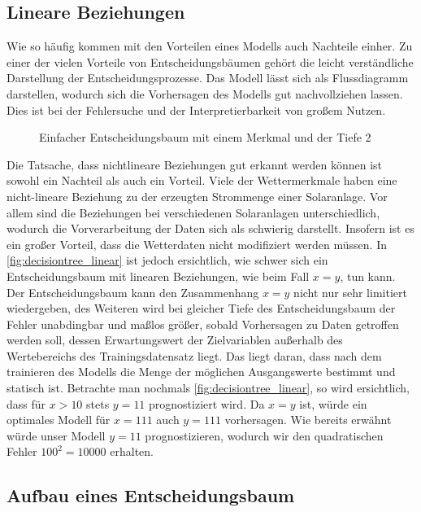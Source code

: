 \documentclass[12pt, a4paper]{article}
\begin{document}

\subsection{Lineare Beziehungen}

Wie so häufig kommen mit den Vorteilen eines Modells auch Nachteile einher. Zu einer der vielen Vorteile von Entscheidungsbäumen gehört die leicht verständliche Darstellung der Entscheidungsprozesse. Das Modell lässt sich als Flussdiagramm darstellen, wodurch sich die Vorhersagen des Modells gut nachvollziehen lassen. Dies ist bei der Fehlersuche und der Interpretierbarkeit von großem Nutzen.

\begin{figure}
\centering
\def\svgwidth{350pt}

\caption{Einfacher Entscheidungsbaum mit einem Merkmal und der Tiefe 2}
\label{fig:decisiontree_linear}
\end {figure}

Die Tatsache, dass nichtlineare Beziehungen gut erkannt werden können ist sowohl ein Nachteil als auch ein Vorteil. Viele der Wettermerkmale haben eine nicht-lineare Beziehung zu der erzeugten Strommenge einer Solaranlage. Vor allem sind die Beziehungen bei verschiedenen Solaranlagen unterschiedlich, wodurch die Vorverarbeitung der Daten sich als schwierig darstellt. Insofern ist es ein großer Vorteil, dass die Wetterdaten nicht modifiziert werden müssen. In \autoref{fig:decisiontree_linear} ist jedoch ersichtlich, wie schwer sich ein Entscheidungsbaum mit linearen Beziehungen, wie beim Fall $x=y$, tun kann. Der Entscheidungsbaum kann den Zusammenhang $x=y$ nicht nur sehr limitiert wiedergeben, des Weiteren wird bei gleicher Tiefe des Entscheidungsbaum der Fehler  unabdingbar und maßlos größer, sobald Vorhersagen zu Daten getroffen werden soll, dessen Erwartungswert der Zielvariablen außerhalb des Wertebereichs des Trainingsdatensatz liegt. Das liegt daran, dass nach dem trainieren des Modells die Menge der möglichen Ausgangswerte bestimmt und statisch ist. Betrachte man nochmals \autoref{fig:decisiontree_linear}, so wird ersichtlich, dass für $x>10$ stets $y=11$ prognostiziert wird. Da $x=y$ ist, würde ein optimales Modell für $x=111$ auch $y=111$ vorhersagen. Wie bereits erwähnt würde unser Modell $y=11$ prognostizieren, wodurch wir den quadratischen Fehler $100^{2}=10000$ erhalten. 

\subsection{Aufbau eines Entscheidungsbaum}
\end{document}
